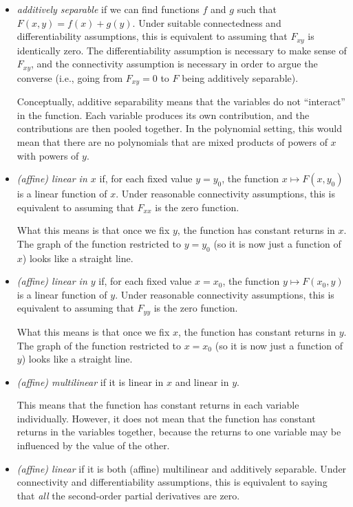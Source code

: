 \documentclass[10pt]{amsart}
\begin{document}
\begin{itemize}
\item {\em additively separable} if we can find functions $f$ and $g$
  such that $F(x,y) = f(x) + g(y)$. Under suitable connectedness and
  differentiability assumptions, this is equivalent to assuming that
  $F_{xy}$ is identically zero. The differentiability assumption is
  necessary to make sense of $F_{xy}$, and the connectivity assumption
  is necessary in order to argue the converse (i.e., going from
  $F_{xy} = 0$ to $F$ being additively separable).

  Conceptually, additive separability means that the variables do not
  ``interact'' in the function. Each variable produces its own
  contribution, and the contributions are then pooled together. In the
  polynomial setting, this would mean that there are no polynomials
  that are mixed products of powers of $x$ with powers of $y$.

\item {\em (affine) linear in $x$} if, for each fixed value $y = y_0$,
  the function $x \mapsto F(x,y_0)$ is a linear function of $x$. Under
  reasonable connectivity assumptions, this is equivalent to assuming
  that $F_{xx}$ is the zero function.

  What this means is that once we fix $y$, the function has constant
  returns in $x$. The graph of the function restricted to $y = y_0$
  (so it is now just a function of $x$) looks like a straight line.

\item {\em (affine) linear in $y$} if, for each fixed value $x = x_0$,
  the function $y \mapsto F(x_0,y)$ is a linear function of $y$. Under
  reasonable connectivity assumptions, this is equivalent to assuming
  that $F_{yy}$ is the zero function.

  What this means is that once we fix $x$, the function has constant
  returns in $y$. The graph of the function restricted to $x = x_0$
  (so it is now just a function of $y$) looks like a straight line.

\item {\em (affine) multilinear} if it is linear in $x$ and linear in $y$.

  This means that the function has constant returns in each variable
  individually. However, it does not mean that the function has
  constant returns in the variables together, because the returns to
  one variable may be influenced by the value of the other.

\item {\em (affine) linear} if it is both (affine) multilinear and
  additively separable. Under connectivity and differentiability
  assumptions, this is equivalent to saying that {\em all} the
  second-order partial derivatives are zero.


\end{itemize}
\end{document}
